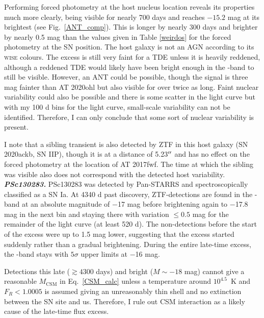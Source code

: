 \documentclass[a4paper,oneside,12pt, class=Latex/Classes/PhDthesisPSnPDF, crop=false]{standalone}
\begin{document}
Performing forced photometry at the host nucleus location reveals its properties much more clearly, being visible for nearly 700 days and reaches $-15.2$ mag at its brightest (see Fig.~\ref{ANT_comp}). This is longer by nearly 300 days and brighter by nearly 0.5 mag than the values given in Table \ref{weirdos} for the forced photometry at the SN position. The host galaxy is not an AGN according to its \textsc{wise} colours. The excess is still very faint for a TDE unless it is heavily reddened, although a reddened TDE would likely have been bright enough in the \ztfi-band to still be visible. However, an ANT could be possible, though the signal is three mag fainter than AT 2020ohl but also visible for over twice as long. Faint nuclear variability could also be possible and there is some scatter in the light curve but with my 100 d bins for the light curve, small-scale variability can not be identified. Therefore, I can only conclude that some sort of nuclear variability is present. 

I note that a sibling transient is also detected by ZTF in this host galaxy (SN 2020ackb, SN IIP), though it is at a distance of 5.23$^{\prime\prime}$ and has no effect on the forced photometry at the location of AT 2017fwf. The time at which the sibling was visible also does not correspond with the detected host variability.\\


\textit{\textbf{PSc130283.}}
PSc130283 was detected by Pan-STARRS and spectroscopically classified as a SN Ia. At 4340 d past discovery, ZTF-detections are found in the \ztfr-band at an absolute magnitude of $-$17 mag before brightening again to $-$17.8 mag in the next bin and staying there with variation $\leq 0.5$ mag for the remainder of the light curve (at least 520 d). The non-detections before the start of the excess were up to 1.5 mag lower, suggesting that the excess started suddenly rather than a gradual brightening. During the entire late-time excess, the \ztfg-band stays with $5\sigma$ upper limits at $-$16 mag.

Detections this late ($\gtrsim 4300$ days) and bright ($M \sim -18$ mag) cannot give a reasonable $M_\text{CSM}$ in Eq.~\ref{CSM_calc} unless a temperature around $10^{4.5}$~K and $F_R < 1.0005$ is assumed giving an unreasonably thin shell and no extinction between the SN site and us. Therefore, I rule out CSM interaction as a likely cause of the late-time flux excess.
\end{document}
